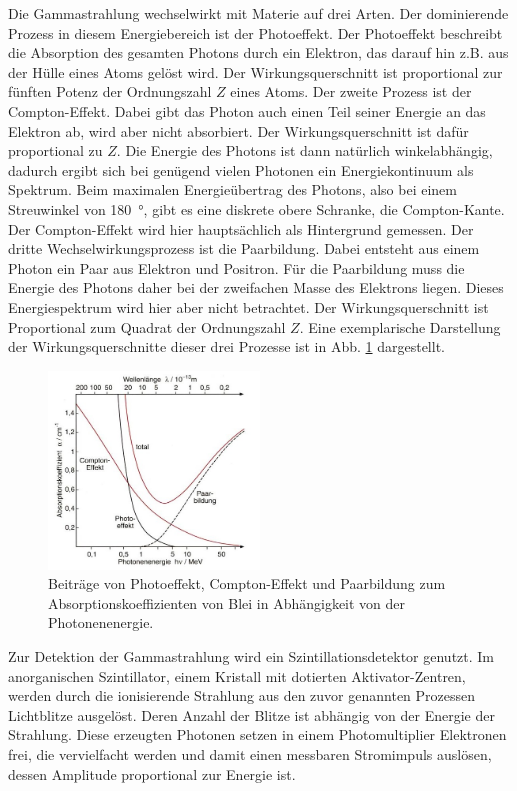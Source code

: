 Die Gammastrahlung wechselwirkt mit Materie auf drei Arten. Der dominierende Prozess in diesem Energiebereich ist der Photoeffekt.
Der Photoeffekt beschreibt die Absorption des gesamten Photons durch ein Elektron, das darauf hin z.B. aus der Hülle eines Atoms gelöst wird. Der Wirkungsquerschnitt ist proportional zur fünften Potenz der Ordnungszahl $Z$ eines Atoms.
Der zweite Prozess ist der Compton-Effekt. Dabei gibt das Photon auch einen Teil seiner Energie an das Elektron ab, wird aber nicht absorbiert. Der Wirkungsquerschnitt ist dafür proportional zu $Z$. Die Energie des Photons ist dann natürlich winkelabhängig, dadurch ergibt sich bei genügend vielen Photonen ein Energiekontinuum als Spektrum. Beim maximalen Energieübertrag des Photons, also bei einem Streuwinkel von \SI{180}{\degree}, gibt es eine diskrete obere Schranke, die Compton-Kante.  
Der Compton-Effekt wird hier hauptsächlich als Hintergrund gemessen. Der dritte Wechselwirkungsprozess ist die Paarbildung. Dabei entsteht aus einem Photon ein Paar aus Elektron und Positron. Für die Paarbildung muss die Energie des Photons daher bei der zweifachen Masse des Elektrons liegen. Dieses Energiespektrum wird hier aber nicht betrachtet. Der Wirkungsquerschnitt ist Proportional zum Quadrat der Ordnungszahl $Z$. 
Eine exemplarische Darstellung der Wirkungsquerschnitte dieser drei Prozesse ist in Abb. \ref{abb:wirkungsquerschnitt} dargestellt.
\begin{figure}
    \centering
    \includegraphics[width=0.5\textwidth]{figures/strahlung.jpg}
    \caption{Beiträge von Photoeffekt, Compton-Effekt und Paarbildung zum Absorptionskoeffizienten von Blei in Abhängigkeit von der Photonenenergie. \cite{strahlung}}
    \label{abb:wirkungsquerschnitt}
    \end{figure}
Zur Detektion der Gammastrahlung wird ein Szintillationsdetektor genutzt. Im anorganischen Szintillator, einem Kristall mit dotierten Aktivator-Zentren, werden durch die ionisierende Strahlung aus den zuvor genannten Prozessen Lichtblitze ausgelöst. Deren Anzahl der Blitze ist abhängig von der Energie der Strahlung. Diese erzeugten Photonen setzen in einem Photomultiplier Elektronen frei, die vervielfacht werden und damit einen messbaren Stromimpuls auslösen, dessen Amplitude proportional zur Energie ist. 